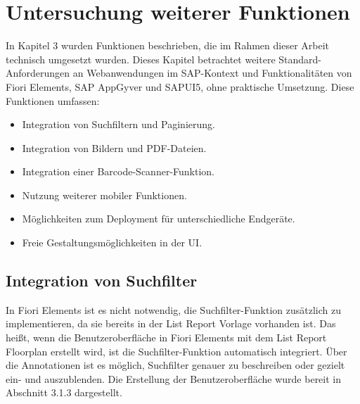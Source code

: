 
\chapter{Untersuchung weiterer Funktionen} \label{UF}

In Kapitel 3 wurden Funktionen beschrieben, die im Rahmen dieser Arbeit technisch umgesetzt wurden. Dieses Kapitel betrachtet weitere Standard-Anforderungen  an Webanwendungen im SAP-Kontext und Funktionalitäten von Fiori Elements, SAP AppGyver und SAPUI5, ohne praktische Umsetzung. Diese Funktionen umfassen: 

\begin{itemize}[noitemsep]
\item Integration von Suchfiltern und Paginierung. 
\item Integration von Bildern und PDF-Dateien.
\item Integration einer Barcode-Scanner-Funktion.
\item Nutzung weiterer mobiler Funktionen. 
\item Möglichkeiten zum Deployment für unterschiedliche Endgeräte.
\item Freie Gestaltungsmöglichkeiten in der UI.
\end{itemize}

\section{Integration von Suchfilter}

In Fiori Elements ist es nicht notwendig, die Suchfilter-Funktion zusätzlich zu implementieren, da sie bereits in der List Report Vorlage vorhanden ist. Das heißt, wenn die Benutzeroberfläche in Fiori Elements mit dem List Report Floorplan erstellt wird, ist die Suchfilter-Funktion automatisch integriert. Über die Annotationen ist es möglich, Suchfilter genauer zu beschreiben oder gezielt ein- und auszublenden. Die Erstellung der Benutzeroberfläche wurde bereit in Abschnitt 3.1.3 dargestellt.


